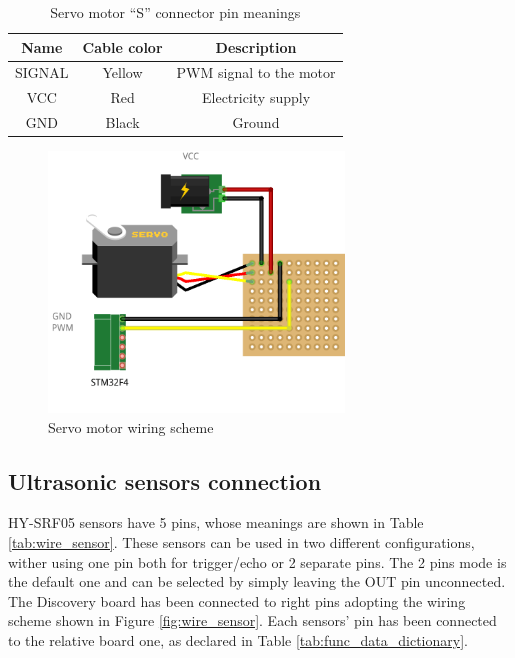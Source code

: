 \begin{table}[p]
\centering

\begin{tabular}{c|c|c}
\hline
\textbf{Name} & \textbf{Cable color} & \textbf{Description}    \\ \hline
SIGNAL        & Yellow               & PWM signal to the motor \\
VCC           & Red                  & Electricity supply      \\
GND           & Black                & Ground                 
\end{tabular}
\caption{Servo motor ``S'' connector pin meanings}
\label{tab:wire_motor}
\end{table}

\begin{figure}[p]
\centering
\includegraphics[width=0.7\textwidth,keepaspectratio]{img/wire-servo.png}
\caption{Servo motor wiring scheme}
\label{fig:wire_motor}
\end{figure}




\subsection{Ultrasonic sensors connection}

HY-SRF05 sensors have 5 pins, whose meanings are shown in Table \ref{tab:wire_sensor}. These sensors can be used in two different configurations, wither using one pin both for trigger/echo or 2 separate pins. The 2 pins mode is the default one and can be selected by simply leaving the OUT pin unconnected. The Discovery board has been connected to right pins adopting the wiring scheme shown in Figure \ref{fig:wire_sensor}. Each sensors' pin has been connected to the relative board one, as declared in Table \ref{tab:func_data_dictionary}. 

